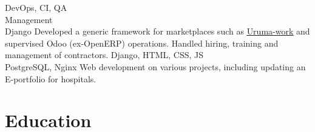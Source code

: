 \documentclass[a4paper,11pt]{cv4tw}%
\begin{document}
{DevOps, CI, QA\\Management\\Django}
{Developed a generic framework for marketplaces such as
  \underline{\href{https://uruma-work.com}{Uruma-work}} and supervised Odoo
  (ex-OpenERP) operations. Handled hiring, training and management of
  contractors.
}
{Django, HTML, CSS, JS\\PostgreSQL, Nginx}
{Web development on various projects, including updating an E-portfolio for
hospitals.
}
\section{Education}

\end{document}
